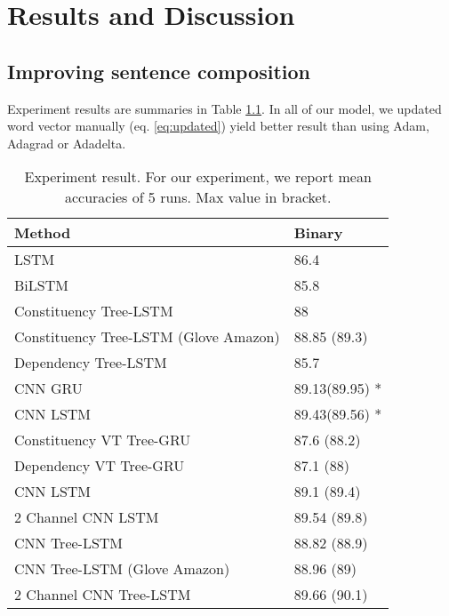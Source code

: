 \chapter{Results and Discussion}\label{result-discuss}


\section{Improving sentence composition}
Experiment results are summaries in Table \ref{table:experimentresult}. In all of our model, we updated word vector manually (eq. \ref{eq:updated}) yield better result than using Adam, Adagrad or Adadelta. 

\begin{table}[H]
	\centering
	\caption{Experiment result. For our experiment, we report mean accuracies of 5 runs. Max value in bracket.}
	\label{table:experimentresult}
	\begin{tabular}{ll}
		Method                                   & Binary \\ \hline
		LSTM                                     & 86.4   \\
		BiLSTM                                   & 85.8   \\ \hline
		Constituency Tree-LSTM \cite{treeLSTM} & 88     \\
		Constituency Tree-LSTM \cite{treeLSTM} (Glove Amazon) & 88.85 (89.3) \\
		Dependency Tree-LSTM  \cite{treeLSTM}  & 85.7   \\ 
		CNN GRU \cite{cnn-rnn}					& 89.13(89.95) *	\\
		CNN LSTM \cite{cnn-rnn}					& 89.43(89.56) *	\\ \hline
		Constituency VT Tree-GRU                 & 87.6 (88.2)  \\
		Dependency VT Tree-GRU                   & 87.1  (88)  \\ \hline
		CNN LSTM 								& 89.1 (89.4)      \\
		2 Channel CNN LSTM						& 89.54	(89.8)	\\
		CNN Tree-LSTM                            & 88.82 (88.9) \\
		CNN Tree-LSTM (Glove Amazon) 			& 88.96 (89) \\
		2 Channel CNN Tree-LSTM  				& 89.66 (90.1)
	\end{tabular}
\end{table}

